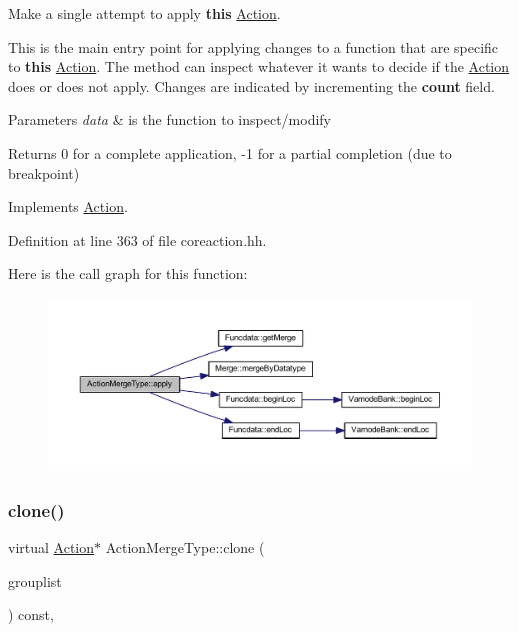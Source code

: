 Make a single attempt to apply {\bfseries{this}} \mbox{\hyperlink{class_action}{Action}}. 

This is the main entry point for applying changes to a function that are specific to {\bfseries{this}} \mbox{\hyperlink{class_action}{Action}}. The method can inspect whatever it wants to decide if the \mbox{\hyperlink{class_action}{Action}} does or does not apply. Changes are indicated by incrementing the {\bfseries{count}} field. 
\begin{DoxyParams}{Parameters}
{\em data} & is the function to inspect/modify \\
\hline
\end{DoxyParams}
\begin{DoxyReturn}{Returns}
0 for a complete application, -\/1 for a partial completion (due to breakpoint) 
\end{DoxyReturn}


Implements \mbox{\hyperlink{class_action_aac1c3999d6c685b15f5d9765a4d04173}{Action}}.



Definition at line 363 of file coreaction.\+hh.

Here is the call graph for this function\+:
\nopagebreak
\begin{figure}[H]
\begin{center}
\leavevmode
\includegraphics[width=350pt]{class_action_merge_type_a512152b02f4dedd4d83fb0ddb4f9a990_cgraph}
\end{center}
\end{figure}
\mbox{\label{class_action_merge_type_a40066f8b61af9229a6527967c4de0ead}} 
\subsubsection{\texorpdfstring{clone()}{clone()}}
{\footnotesize\ttfamily virtual \mbox{\hyperlink{class_action}{Action}}$\ast$ Action\+Merge\+Type\+::clone (\begin{DoxyParamCaption}\item[{const \mbox{\hyperlink{class_action_group_list}{Action\+Group\+List}} \&}]{grouplist }\end{DoxyParamCaption}) const\hspace{0.3cm}{\ttfamily [inline]}, {\ttfamily [virtual]}}



